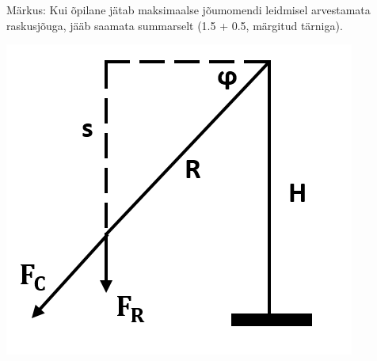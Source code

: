 Märkus: Kui õpilane jätab maksimaalse jõumomendi leidmisel arvestamata raskusjõuga, jääb saamata summarselt  (1.5 + 0.5, märgitud tärniga).
\begin{center}
\includegraphics[scale=0.5]{2019-v2g-09-yl.png}
\end{center}
\probend